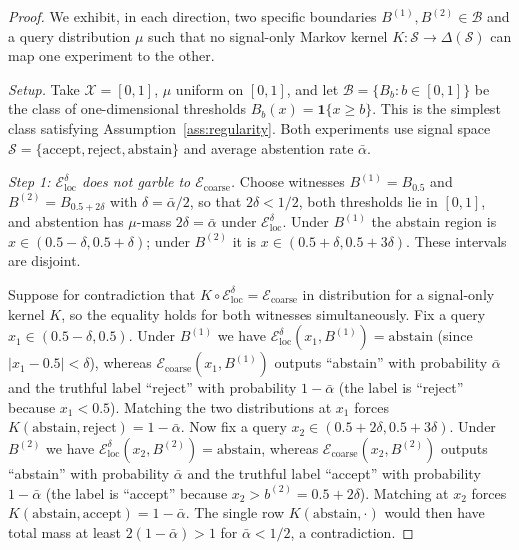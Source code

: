 \documentclass[runningheads,envcountsame]{llncs}
\newcommand{\cB}{\mathcal{B}}
\newcommand{\cX}{\mathcal{X}}
\newcommand{\cS}{\mathcal{S}}
\newcommand{\cE}{\mathcal{E}}
\newcommand{\ind}{\mathbf{1}}
\begin{document}
\begin{proof}
We exhibit, in each direction, two specific boundaries $B^{(1)}, B^{(2)} \in \cB$ and a query distribution $\mu$ such that no signal-only Markov kernel $K : \cS \to \Delta(\cS)$ can map one experiment to the other.

\emph{Setup.} Take $\cX = [0,1]$, $\mu$ uniform on $[0,1]$, and let $\cB = \{B_b : b \in [0,1]\}$ be the class of one-dimensional thresholds $B_b(x) = \ind\{x \geq b\}$. This is the simplest class satisfying Assumption~\ref{ass:regularity}. Both experiments use signal space $\cS = \{\text{accept}, \text{reject}, \text{abstain}\}$ and average abstention rate $\bar\alpha$.

\emph{Step 1: $\cE_{\mathrm{loc}}^\delta$ does not garble to $\cE_{\mathrm{coarse}}$.}
Choose witnesses $B^{(1)} = B_{0.5}$ and $B^{(2)} = B_{0.5 + 2\delta}$ with $\delta = \bar\alpha/2$, so that $2\delta < 1/2$, both thresholds lie in $[0,1]$, and abstention has $\mu$-mass $2\delta = \bar\alpha$ under $\cE_{\mathrm{loc}}^\delta$. Under $B^{(1)}$ the abstain region is $x \in (0.5 - \delta, 0.5 + \delta)$; under $B^{(2)}$ it is $x \in (0.5 + \delta, 0.5 + 3\delta)$. These intervals are disjoint.

Suppose for contradiction that $K \circ \cE_{\mathrm{loc}}^\delta = \cE_{\mathrm{coarse}}$ in distribution for a signal-only kernel $K$, so the equality holds for both witnesses simultaneously. Fix a query $x_1 \in (0.5 - \delta, 0.5)$. Under $B^{(1)}$ we have $\cE_{\mathrm{loc}}^\delta(x_1, B^{(1)}) = \text{abstain}$ (since $|x_1 - 0.5| < \delta$), whereas $\cE_{\mathrm{coarse}}(x_1, B^{(1)})$ outputs ``abstain'' with probability $\bar\alpha$ and the truthful label ``reject'' with probability $1 - \bar\alpha$ (the label is ``reject'' because $x_1 < 0.5$). Matching the two distributions at $x_1$ forces $K(\text{abstain}, \text{reject}) = 1 - \bar\alpha$. Now fix a query $x_2 \in (0.5 + 2\delta, 0.5 + 3\delta)$. Under $B^{(2)}$ we have $\cE_{\mathrm{loc}}^\delta(x_2, B^{(2)}) = \text{abstain}$, whereas $\cE_{\mathrm{coarse}}(x_2, B^{(2)})$ outputs ``abstain'' with probability $\bar\alpha$ and the truthful label ``accept'' with probability $1 - \bar\alpha$ (the label is ``accept'' because $x_2 > b^{(2)} = 0.5 + 2\delta$). Matching at $x_2$ forces $K(\text{abstain}, \text{accept}) = 1 - \bar\alpha$. The single row $K(\text{abstain}, \cdot)$ would then have total mass at least $2(1-\bar\alpha) > 1$ for $\bar\alpha < 1/2$, a contradiction.


\end{proof}
\end{document}
